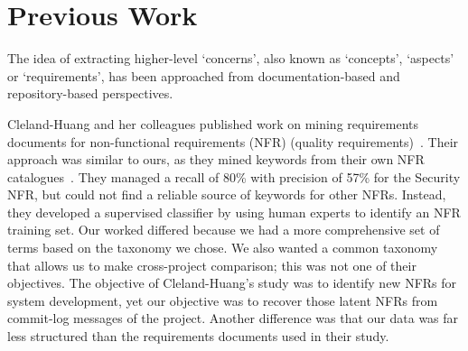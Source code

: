 \documentclass[]{sig-alternate}
\begin{document}



\section{Previous Work}
\label{sec:related}

The idea of extracting higher-level `concerns', also known as `concepts', `aspects' or `requirements', has been approached from documentation-based and repository-based perspectives.

Cleland-Huang and her colleagues published work on mining requirements documents for non-functional requirements (NFR) (quality requirements)~\cite{Cleland-Huang2006}. 
Their approach was similar to ours, as they mined keywords from their own NFR catalogues~\cite{chung99}.
They managed a recall of 80\% with precision of 57\% for the Security NFR, but could not find a reliable source of keywords for other NFRs. 
Instead, they developed a supervised classifier by using human experts to identify an NFR training set. 
Our worked differed because we had a more comprehensive set of terms based on the taxonomy we chose.
We also wanted a common taxonomy that allows us to make cross-project comparison; this was not one of their objectives.
The objective of Cleland-Huang's study was to identify new NFRs for system development, yet our objective was to recover those latent NFRs from commit-log messages of the project. 
Another difference was that our data was far less structured than the requirements documents used in their study.
\end{document}
